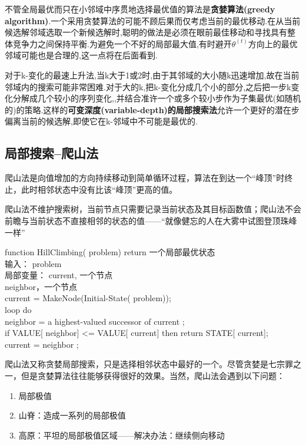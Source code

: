 \documentclass[11pt,a4paper,oneside]{book}
\begin{document}
不管全局最优而只在小邻域中序贯地选择最优值的算法是\textbf{贪婪算法(greedy algorithm)}.一个采用贪婪算法的可能不顾后果而仅考虑当前的最优移动.在从当前候选解邻域选取一个新候选解时,聪明的做法是必须在眼前最佳移动和寻找具有整体竞争力之间保持平衡.为避免一个不好的局部最大值,有时避开$ \theta^{(t)} $方向上的最优邻域可能也是合理的,这一点将在后面看到.


对于k-变化的最速上升法,当k大于1或2时,由于其邻域的大小随k迅速增加,故在当前邻域内的搜索可能非常困难.对于大的k,把k-变化分成几个小的部分,之后把一步k变化分解成几个较小的序列变化,,并结合准许一个或多个较小步作为子集最优(如随机的)的策略.这样的\textbf{可变深度(variable-depth)的局部搜索法}允许一个更好的潜在步偏离当前的候选解,即使它在k-邻域中不可能是最优的.

\subsection{局部搜索--爬山法}
爬山法是向值增加的方向持续移动到简单循环过程，算法在到达一个“峰顶”时终止，此时相邻状态中没有比该“峰顶”更高的值。

爬山法不维护搜索树，当前节点只需要记录当前状态及其目标函数值；爬山法不会前瞻与当前状态不直接相邻的状态的值——“就像健忘的人在大雾中试图登顶珠峰一样”
\begin{tcolorbox}[colback=black!5!white,colframe=black!60!]
function HillClimbing( problem) return 一个局部最优状态\\
    输入： problem\\
局部变量： current, 一个节点\\
          neighbor，一个节点\\
current = MakeNode(Initial-State( problem));\\
loop do\\
   neighbor = a highest-valued successor of  current ;\\
   if VALUE[ neighbor] <= VALUE[ current] then return STATE[ current];\\
   current =  neighbor ;
\end{tcolorbox}

爬山法又称贪婪局部搜索，只是选择相邻状态中最好的一个。尽管贪婪是七宗罪之一，但是贪婪算法往往能够获得很好的效果。当然，爬山法会遇到以下问题：
\begin{enumerate}
	\item 局部极值
	\item 山脊：造成一系列的局部极值
	\item 高原：平坦的局部极值区域——解决办法：继续侧向移动
\end{enumerate}
\end{document}
